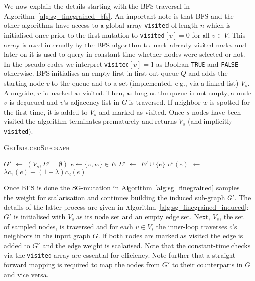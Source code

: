 \documentclass[twoside]{article}
\begin{document}
We now explain the details starting with the BFS-traversal in Algorithm~\ref{alg:sg_finegrained_bfs}. An important note is that BFS and the other algorithms have access to a global array \verb|visited| of length $n$ which is initialised once prior to the first mutation to \verb|visited|$[v] = 0$ for all $v \in V$. This array is used internally by the BFS algorithm to mark already visited nodes and later on it is used to query in constant time whether nodes were selected or not. In the pseudo-codes we interpret \verb|visited|$[v]=1$ as Boolean \texttt{TRUE} and \texttt{FALSE} otherwise. BFS initialises an empty first-in-first-out queue $Q$ and adds the starting node $v$ to the queue and to a set (implemented, e.g., via a linked-list) $V_s$. Alongside, $v$ is marked as visited. Then, as long as the queue is not empty, a node $v$ is dequeued and $v$'s adjacency list in $G$ is traversed. If neighbor $w$ is spotted for the first time, it is added to $V_s$ and marked as visited. Once $s$ nodes have been visited the algorithm terminates prematurely and returns $V_s$ (and implicitly \verb|visited|).

\begin{algorithm}[H]
\caption{\textsc{GetInducedSubgraph}}
\label{alg:sg_finegrained_induced}
\begin{algorithmic}[1] 
\State $G'$ $\gets$ $(V_s, E' = \emptyset)$
     
        \State $e \gets \{v, w\} \in E$
            \State $E'$ $\gets$ $E' \cup \{e\}$
            \State $c^s(e)$ $\gets$ $\lambda c_1(e) + (1-\lambda) c_2(e)$ 
        \EndIf
    \EndFor
\EndFor
\State {}
\end{algorithmic}
\end{algorithm}

Once BFS is done the SG-mutation in Algorithm~\ref{alg:sg_finegrained} samples the weight for scalarisation and continues building the induced sub-graph $G'$. The details of the latter process are given in Algorithm~\ref{alg:sg_finegrained_induced}: $G'$ is initialised with $V_s$ as its node set and an empty edge set. Next, $V_s$, the set of sampled nodes, is traversed and for each $v \in V_s$ the inner-loop traverses $v$'s neighbors in the input graph $G$. If both nodes are marked as visited the edge is added to $G'$ and the edge weight is scalarised. Note that the constant-time checks via the \verb|visited| array are essential for efficiency. Note further that a straight-forward mapping is required to map the nodes from $G'$ to their counterparts in $G$ and vice versa.
\end{document}
